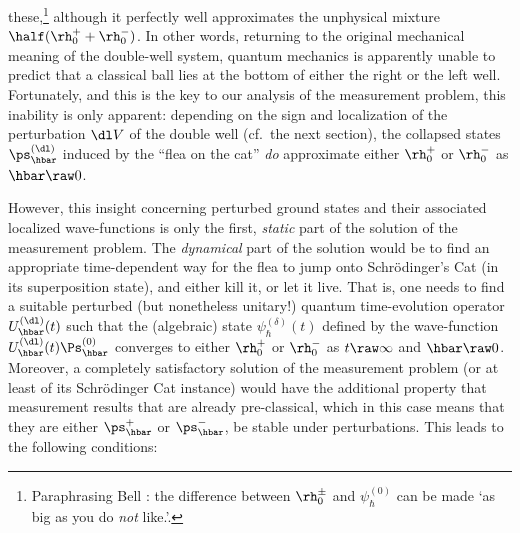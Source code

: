 \documentclass[12pt]{article}
\newcommand{\mmp}{measurement problem}
\begin{document}
 these,\footnote{Paraphrasing Bell \cite{BellCH}: the difference between $\rh_0^{\pm}$ and $\psi_{\hbar}^{(0)}$ can be made `as big as you do \emph{not} like.'. } although it perfectly well approximates the unphysical mixture $\half(\rh_0^+ + \rh_0^-)$. In other words, returning to the original mechanical meaning of the double-well system, quantum mechanics is apparently unable to predict that a classical ball 
lies at the bottom of either  the right or  the left well. 
 Fortunately, and this is the key to our analysis of the \mmp, this inability is only apparent: 
 depending on the sign and localization of the perturbation $\dl V$ of the double well (cf.\ the next section), the collapsed states $\ps^{(\dl)}_{\hbar}$ induced by the ``flea on the cat'' \emph{do} approximate either $\rh_0^+$ or  $\rh_0^-$ as $\hbar\raw 0$.
 
 However, this insight concerning perturbed ground states and their associated localized wave-functions is only the first, \emph{static}  part
of the solution of the \mmp. The \emph{dynamical} part of the solution would be to find an appropriate time-dependent way for the flea to jump 
onto Schr\"{o}dinger's Cat (in its superposition state), and either kill it, or let it live. That is, one needs to find a
suitable  perturbed (but nonetheless  unitary!) quantum  time-evolution operator $U_{\hbar}^{(\dl)}(t)$ such that  the (algebraic) state
$\psi^{(\delta)}_{\hbar}(t)$ defined by the wave-function $U_{\hbar}^{(\dl)}(t)\Ps^{(0)}_{\hbar}$ converges to either $\rh_0^+$ or  $\rh_0^-$ as $t\raw\infty$ and $\hbar\raw 0$. Moreover, a completely  satisfactory solution of the measurement problem (or at least of its  Schr\"{o}dinger Cat instance) would 
have the additional property that measurement results that are already pre-classical, which in this case means that they are either $\ps^+_{\hbar}$ or $\ps^-_{\hbar}$, be stable under perturbations.
 This leads to the following conditions:
 
\end{document}
